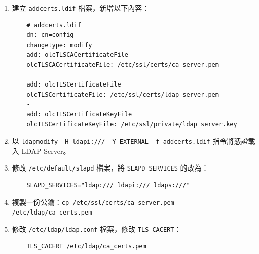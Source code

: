 \documentclass[12pt]{article}
\begin{document}
\begin{enumerate}
  \item 建立 \texttt{addcerts.ldif} 檔案，新增以下內容：
  \begin{verbatim}
    # addcerts.ldif
    dn: cn=config
    changetype: modify
    add: olcTLSCACertificateFile
    olcTLSCACertificateFile: /etc/ssl/certs/ca_server.pem
    -
    add: olcTLSCertificateFile
    olcTLSCertificateFile: /etc/ssl/certs/ldap_server.pem
    -
    add: olcTLSCertificateKeyFile
    olcTLSCertificateKeyFile: /etc/ssl/private/ldap_server.key
  \end{verbatim}
  \item 以 \texttt{ldapmodify -H ldapi:/// -Y EXTERNAL -f addcerts.ldif} 指令將憑證載入 LDAP Server。

  \item 修改 \texttt{/etc/default/slapd} 檔案，將 \texttt{SLAPD\_SERVICES} 的改為：
  \begin{verbatim}
    SLAPD_SERVICES="ldap:/// ldapi:/// ldaps:///"
  \end{verbatim}

  \item 複製一份公鑰：\texttt{cp /etc/ssl/certs/ca\_server.pem /etc/ldap/ca\_certs.pem}
  \item 修改 \texttt{/etc/ldap/ldap.conf} 檔案，修改 \texttt{TLS\_CACERT}：
  \begin{verbatim}
    TLS_CACERT /etc/ldap/ca_certs.pem
  \end{verbatim}


\end{enumerate}
\end{document}
